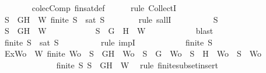 \begin{isabellebody}
\ \ \ \ \ \ \isamarkupfalse%
\ colecComp\ fin{\isacharunderscore}sat{\isacharunderscore}def\isanewline
\ \ \ \ \isamarkupfalse%
\ {\isacharparenleft}rule\ CollectI{\isacharparenright}\isanewline
\ \ \ \ \ \ \isamarkupfalse%
\ {\isachardoublequoteopen}{\isasymforall}S\ {\isasymsubseteq}\ {\isacharbraceleft}G{\isacharcomma}H{\isacharbraceright}\ {\isasymunion}\ W{\isachardot}\ finite\ S\ {\isasymlongrightarrow}\ sat\ S{\isachardoublequoteclose}\isanewline
\ \ \ \ \ \ \isamarkupfalse%
\ {\isacharparenleft}rule\ sallI{\isacharparenright}\isanewline
\ \ \ \ \ \ \ \ \isamarkupfalse%
\ S\isanewline
\ \ \ \ \ \ \ \ \isamarkupfalse%
\ {\isachardoublequoteopen}S\ {\isasymsubseteq}\ {\isacharbraceleft}G{\isacharcomma}H{\isacharbraceright}\ {\isasymunion}\ W{\isachardoublequoteclose}\isanewline
\ \ \ \ \ \ \ \ \isamarkupfalse%
\ \isamarkupfalse%
\ {\isachardoublequoteopen}S\ {\isasymsubseteq}\ {\isacharbraceleft}G{\isacharbraceright}\ {\isasymunion}\ {\isacharparenleft}{\isacharbraceleft}H{\isacharbraceright}\ {\isasymunion}\ W{\isacharparenright}{\isachardoublequoteclose}\isanewline
\ \ \ \ \ \ \ \ \ \ \isamarkupfalse%
\ blast\ \isanewline
\ \ \ \ \ \ \ \ \isamarkupfalse%
\ {\isachardoublequoteopen}finite\ S\ {\isasymlongrightarrow}\ sat\ S{\isachardoublequoteclose}\isanewline
\ \ \ \ \ \ \ \ \isamarkupfalse%
\ {\isacharparenleft}rule\ impI{\isacharparenright}\isanewline
\ \ \ \ \ \ \ \ \ \ \isamarkupfalse%
\ {\isachardoublequoteopen}finite\ S{\isachardoublequoteclose}\ \isanewline
\ \ \ \ \ \ \ \ \ \ \isamarkupfalse%
\ Ex{\isacharcolon}{\isachardoublequoteopen}{\isasymexists}Wo\ {\isasymsubseteq}\ W{\isachardot}\ finite\ Wo\ {\isasymand}\ {\isacharparenleft}S\ {\isacharequal}\ {\isacharbraceleft}G{\isacharcomma}H{\isacharbraceright}\ {\isasymunion}\ Wo\ {\isasymor}\ S\ {\isacharequal}\ {\isacharbraceleft}G{\isacharbraceright}\ {\isasymunion}\ Wo\ {\isasymor}\ S\ {\isacharequal}\ {\isacharbraceleft}H{\isacharbraceright}\ {\isasymunion}\ Wo\ {\isasymor}\ S\ {\isacharequal}\ Wo{\isacharparenright}{\isachardoublequoteclose}\isanewline
\ \ \ \ \ \ \ \ \ \ \ \ \isamarkupfalse%
\ {\isacartoucheopen}finite\ S{\isacartoucheclose}\ {\isacartoucheopen}S\ {\isasymsubseteq}\ {\isacharbraceleft}G{\isacharcomma}H{\isacharbraceright}\ {\isasymunion}\ W{\isacartoucheclose}\ \isamarkupfalse%
\ {\isacharparenleft}rule\ finite{\isacharunderscore}subset{\isacharunderscore}insert{}{\isacharparenright}\isanewline

\end{isabellebody}
